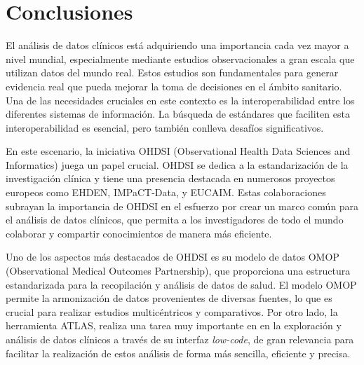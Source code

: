 \chapter{Conclusiones}\label{cap:11conclusiones}

El análisis de datos clínicos está adquiriendo una importancia cada vez mayor a nivel mundial, especialmente mediante estudios observacionales a gran escala que utilizan datos del mundo real. Estos estudios son fundamentales para generar evidencia real que pueda mejorar la toma de decisiones en el ámbito sanitario. Una de las necesidades cruciales en este contexto es la interoperabilidad entre los diferentes sistemas de información. La búsqueda de estándares que faciliten esta interoperabilidad es esencial, pero también conlleva desafíos significativos.

En este escenario, la iniciativa OHDSI (Observational Health Data Sciences and Informatics) juega un papel crucial. OHDSI se dedica a la estandarización de la investigación clínica y tiene una presencia destacada en numerosos proyectos europeos como EHDEN, IMPaCT-Data, y EUCAIM. Estas colaboraciones subrayan la importancia de OHDSI en el esfuerzo por crear un marco común para el análisis de datos clínicos, que permita a los investigadores de todo el mundo colaborar y compartir conocimientos de manera más eficiente.

Uno de los aspectos más destacados de OHDSI es su modelo de datos OMOP (Observational Medical Outcomes Partnership), que proporciona una estructura estandarizada para la recopilación y análisis de datos de salud. El modelo OMOP permite la armonización de datos provenientes de diversas fuentes, lo que es crucial para realizar estudios multicéntricos y comparativos. %
Por otro lado, la herramienta ATLAS, realiza una tarea muy importante en en la exploración y análisis de datos clínicos a través de su interfaz \textit{low-code}, de gran relevancia para facilitar la realización de estos análisis de forma más sencilla, eficiente y precisa. 


